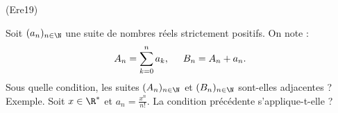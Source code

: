\begin{tiny}(Ere19)\end{tiny} Soit $(a_n)_{n\in\N}$ une suite de nombres réels strictement positifs. On note :
\[
 A_n = \sum_{k=0}^{n}a_k, \hspace{0.5cm} B_n = A_n + a_n.
\]
Sous quelle condition, les suites $(A_n)_{n\in\N}$ et $(B_n)_{n\in\N}$ sont-elles adjacentes ?\newline
Exemple. Soit $x\in \R^*$  et $a_n = \frac{x^n}{n!}$. La condition précédente s'applique-t-elle ?
